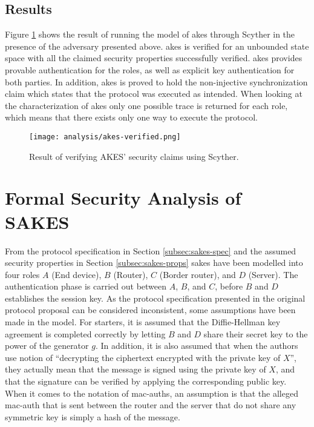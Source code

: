 \subsection{Results}

Figure \ref{fig:akes-verified} shows the result of running the model of \gls{akes} through Scyther in the presence of the adversary presented above. \gls{akes} is verified for an unbounded state space with all the claimed security properties successfully verified. \gls{akes} provides provable authentication for the roles, as well as explicit key authentication for both parties. In addition, \gls{akes} is proved to hold the non-injective synchronization claim which states that the protocol was executed as intended. When looking at the characterization of \gls{akes} only one possible trace is returned for each role, which means that there exists only one way to execute the protocol.

\begin{figure}[h]
	\centering
	\texttt{[image: analysis/akes-verified.png]}
	\caption{Result of verifying AKES' security claims using Scyther.}
	\label{fig:akes-verified}
\end{figure}


\section{Formal Security Analysis of SAKES}
\label{sec:anal-sakes}

From the protocol specification in Section \ref{subsec:sakes-spec} and the assumed security properties in Section \ref{subsec:sakes-props} \gls{sakes} have been modelled into four roles $A$ (End device), $B$ (Router), $C$ (Border router), and $D$ (Server). The authentication phase is carried out between $A$, $B$, and $C$, before $B$ and $D$ establishes the session key. As the protocol specification presented in the original protocol proposal can be considered inconsistent, some assumptions have been made in the model. For starters, it is assumed that the Diffie-Hellman key agreement is completed correctly by letting $B$ and $D$ share their secret key to the power of the generator $g$. In addition, it is also assumed that when the authors use notion of ``decrypting the ciphertext encrypted with the private key of $X$'', they actually mean that the message is signed using the private key of $X$, and that the signature can be verified by applying the corresponding public key. When it comes to the notation of \gls{mac-auth}s, an assumption is that the alleged \gls{mac-auth} that is sent between the router and the server that do not share any symmetric key is simply a hash of the message. 


